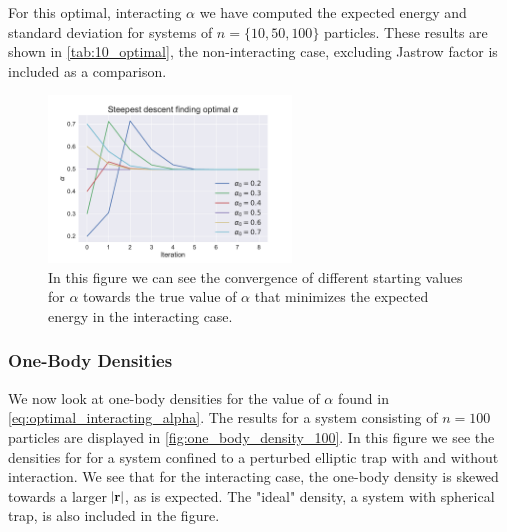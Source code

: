 \documentclass[
    a4paper, aps, twocolumn, floatfix, superscriptaddress,
    nofootinbib]{revtex4-1}
\newcommand{\vf}{\mathbf}
\newcommand{\1}{\mathds{1}}
\begin{document}
            For this optimal, interacting $\alpha$ we have computed the expected
            energy and standard deviation for systems of $n = \{10, 50, 100\}$
            particles. These results are shown in \autoref{tab:10_optimal}, the
            non-interacting case, excluding Jastrow factor is included as a
            comparison.

            \begin{figure}
                \includegraphics[width=244px]{../data/figures/problem_f.pdf}
                \caption{In this figure we can see the convergence of different
                starting values for $\alpha$ towards the true value of $\alpha$
                that minimizes the expected energy in the interacting case.}
                \label{fig:gradient_descent_interacting}
            \end{figure}

        \subsubsection{One-Body Densities}
            We now look at one-body densities for the value of $\alpha$ found in
            \autoref{eq:optimal_interacting_alpha}. The results for a system consisting
            of $n=100$ particles are displayed in \autoref{fig:one_body_density_100}.
            In this figure we see the densities for for a system confined to a
            perturbed elliptic trap with and without interaction. We see that for the
            interacting case, the one-body density is skewed towards a larger
            $\abs{\vf{r}}$, as is expected. The "ideal" density, a system with spherical
            trap, is also included in the figure.
\end{document}
